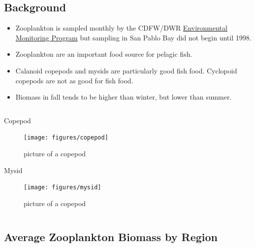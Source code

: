 \documentclass[
]{book}
\providecommand{\tightlist}{%
  \setlength{\itemsep}{0pt}\setlength{\parskip}{0pt}}
\begin{document}
\begin{columns-nocenter}

\begin{column}

\hypertarget{background-3}{%
\subsection{Background}\label{background-3}}

\begin{itemize}
\tightlist
\item
  Zooplankton is sampled monthly by the CDFW/DWR \href{https://emp.baydeltalive.com/wiki/12297}{Environmental Monitoring Program} but sampling in San Pablo Bay did not begin until 1998.
\item
  Zooplankton are an important food source for pelagic fish.
\item
  Calanoid copepods and mysids are particularly good fish food. Cyclopoid copepods are not as good for fish food.
\item
  Biomass in fall tends to be higher than winter, but lower than summer.
\end{itemize}

\end{column}

\begin{column}

Copepod

\begin{figure}

{\centering \texttt{[image: figures/copepod]} 

}

\caption{picture of a copepod}\label{fig:unnamed-chunk-112}
\end{figure}

Mysid

\begin{figure}

{\centering \texttt{[image: figures/mysid]} 

}

\caption{picture of a copepod}\label{fig:unnamed-chunk-113}
\end{figure}

\end{column}

\end{columns-nocenter}

\hypertarget{average-zooplankton-biomass-by-region}{%
\subsection{Average Zooplankton Biomass by Region}\label{average-zooplankton-biomass-by-region}}
\end{document}
